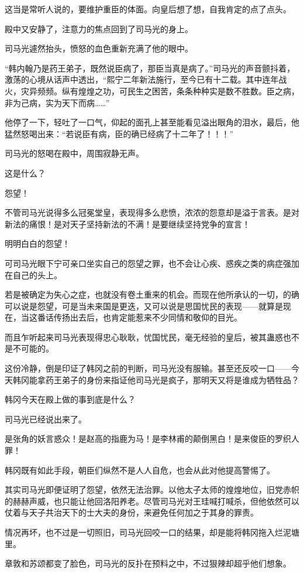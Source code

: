 这当是常听人说的，要维护重臣的体面。向皇后想了想，自我肯定的点了点头。

殿中又安静了，注意力的焦点回到了司马光的身上。

司马光遽然抬头，愤怒的血色重新充满了他的眼中。

“韩内翰乃是药王弟子，既然说臣病了，那臣当真是病了。”司马光的声音颤抖着，激荡的心境从话声中透出，“熙宁二年新法施行，至今已有十二载。其中连年战火，灾异频频。纵有煌煌之功，可民生之困苦，条条种种实是数不胜数。臣之病，非为己病，实为天下而病……”

他停了一下，轻吐了一口气，仰起的面孔上甚至能看见溢出眼角的泪水，最后，他猛然怒喝出来：“若说臣有病，臣的确已经病了十二年了！！！”

司马光的怒喝在殿中，周围寂静无声。

这是什么？

怨望！

不管司马光说得多么冠冕堂皇，表现得多么悲愤，浓浓的怨意却是溢于言表。是对新法的痛恨！是对天子坚持新法的不满！是要继续坚持党争的宣言！

明明白白的怨望！

可司马光眼下宁可亲口坐实自己的怨望之罪，也不会让心疾、惑疾之类的病症强加在自己的头上。

若是被确定为失心之症，也就没有卷土重来的机会。而现在他所承认的一切，的确可以说是怨望，可是当未来国是更迭，又可以说是思国忧民的表现——就算是现在，当这番话传扬出去后，也肯定能惹来不少同情和敬仰的目光。

而且乍听起来司马光表现得忠心耿耿，忧国忧民，毫无经验的皇后，被其蛊惑也不是不可能的。

这份冷静，倒是印证了韩冈之前的判断，司马光没有服输。甚至还反咬一口——今天韩冈能拿药王弟子的身份来指证他司马光是疯子，那明天又将是谁成为牺牲品？

韩冈今天在殿上做的事到底是什么？

司马光已经说出来了。

是张角的妖言惑众！是赵高的指鹿为马！是李林甫的颠倒黑白！是来俊臣的罗织人罪！

韩冈既有如此手段，朝臣们纵然不是人人自危，也会从此对他提高警惕了。

其实司马光即便证明了怨望，依然无法治罪。以他太子太师的煌煌地位，旧党赤帜的赫赫声威，也只能让他回洛阳养老。尽管司马光对王珪喊打喊杀，但他依然可以仗着与天子共治天下的士大夫的身份，来避免任何加之于其身的罪责。

情况再坏，也不过是一切照旧，司马光回咬一口的结果，却是能将韩冈拖入烂泥塘里。

章敦和苏颂都变了脸色，司马光的反扑在预料之中，不过狠辣却超乎他们想象。

